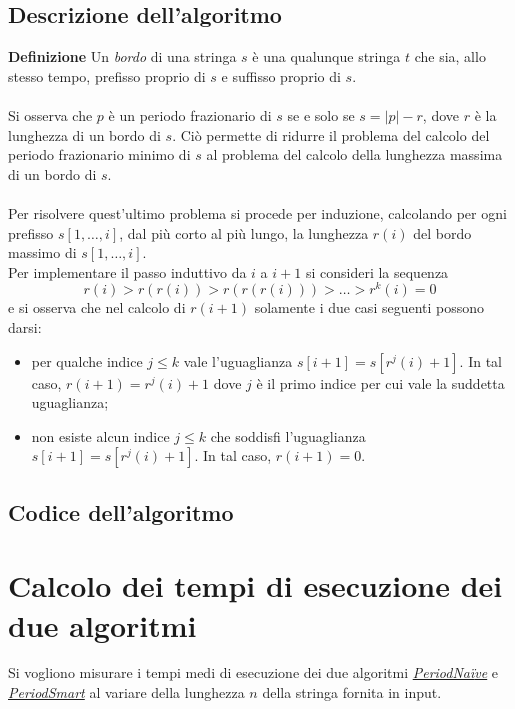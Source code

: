 \documentclass[11pt,a4paper,italian]{article}
\begin{document}
\subsection{Descrizione dell'algoritmo}
\textbf{Definizione} Un \textit{bordo} di una stringa $s$ è una qualunque stringa $t$ che sia, allo stesso tempo, prefisso proprio di $s$ e suffisso proprio di $s$.\\
\\
Si osserva che $p$ è un periodo frazionario di $s$ se e solo se $s = |p|-r$, dove $r$ è la lunghezza di un bordo di $s$. Ciò permette di ridurre il problema del calcolo del periodo frazionario minimo di $s$ al problema del calcolo della lunghezza massima di un bordo di $s$.\\ 
\\
Per risolvere quest'ultimo problema si procede per induzione, calcolando per ogni prefisso $s[1,\dots,i]$, dal più corto al più lungo, la lunghezza $r(i)$ del bordo massimo di $s[1,\dots,i]$.\\
Per implementare il passo induttivo da $i$ a $i+1$ si consideri la sequenza
\begin{equation*}
r(i)>r(r(i))>r(r(r(i)))>\dots>r^{k}(i)=0
\end{equation*}
e si osserva che nel calcolo di $r(i+1)$ solamente i due casi seguenti possono darsi:
\begin{itemize}
\item per qualche indice $j \leq k$ vale l'uguaglianza $s[i+1] = s[r^{j}(i)+1]$. In tal caso, $r(i+1) = r^{j}(i)+1$ dove $j$ è il primo indice per cui vale la suddetta uguaglianza;
\item non esiste alcun indice $j \leq k$ che soddisfi l'uguaglianza $s[i+1] = s[r^{j}(i)+1]$. In tal caso, $r(i+1) = 0$.
\end{itemize}

\subsection{Codice dell'algoritmo}
 



\section{Calcolo dei tempi di esecuzione dei due algoritmi}
Si vogliono misurare i tempi medi di esecuzione dei due algoritmi \hyperlink{section.2}{\textit{PeriodNa{\"i}ve}} e \hyperlink{section.3}{\textit{PeriodSmart}} al variare della lunghezza $n$ della stringa fornita in input.\\
\end{document}
